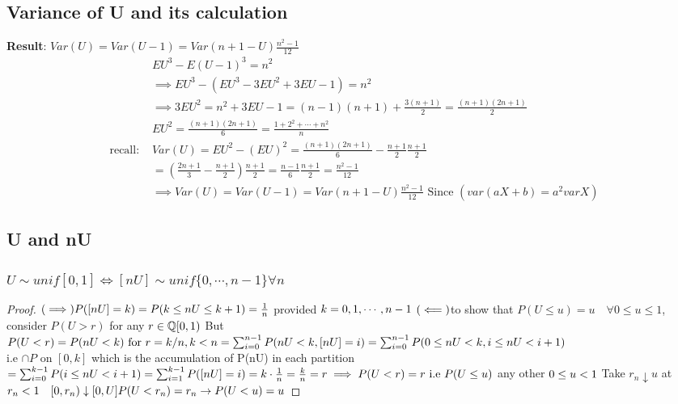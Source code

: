 \documentclass{article}
\theoremstyle{definition}
\theoremstyle{thrm}
\theoremstyle{lma}
\theoremstyle{ppst}
\theoremstyle{crlr}
\begin{document}
\subsection{Variance of U and its calculation}
\textbf{Result}: $Var(U) = Var(U-1) = Var(n+1-U)\frac{n^2-1}{12}$\\
\begin{align*}
	&EU^3-E(U-1)^3 =n^2\\
	&\implies EU^3-(EU^3-3EU^2+3EU-1)=n^2\\
	&\implies 3EU^2 = n^2+3EU-1=(n-1)(n+1)+\frac{3(n+1)}{2} = \frac{(n+1)(2n+1)}{2}\\
	&EU^2 = \frac{(n+1)(2n+1)}{6} = \frac{1+2^2+\cdots+n^2}{n}\\
	\text{recall: } &Var(U) = EU^2-(EU)^2 = \frac{(n+1)(2n+1)}{6}- \frac{n+1}{2}\frac{n+1}{2}\\
	&=(\frac{2n+1}{3}-\frac{n+1}{2})\frac{n+1}{2} = \frac{n-1}{6}\frac{n+1}{2} = \frac{n^2-1}{12}\\
	&\implies Var(U) = Var(U-1) = Var(n+1-U)\frac{n^2-1}{12} \text{ Since }(var(aX+b) = a^2varX)
\end{align*}
\subsection{U and nU}
\subsubsection{$U\sim unif[0,1]\iff [nU]\sim unif\{0,\cdots,n-1\}\forall n$}
\begin{proof}
	$\\ (\implies)\\ P([nU]=k) = P(k \leq nU \leq k+1) = \frac{1}{n}$ provided $k=0,1,\cdots, n-1\\$
	$(\impliedby)\\$to show that $P(U\leq u) = u \quad \forall 0\leq u\leq 1$, consider $P(U>r)$ for any $r \in \mathbb{Q}[0,1)\\$ But
	$P(U <r) = P(nU < k) \text{ for } r = k/n, k<n \\= \sum_{i=0}^{n-1}P(nU<k,[nU]=i) = \sum_{i=0}^{n-1}P(0 \leq nU <k, i\leq nU<i+1)$ \\
	i.e $\cap P \text{ on } [0,k]$ which is the accumulation of P(nU) in each partition\\
	$= \sum_{i=0}^{k-1}P(i\leq nU<i+1) = \sum_{i=1}^{k-1}P([nU]=i)\\
	=k \cdot \frac{1}{n} = \frac{k}{n} = r\\ \implies P(U<r) = r \text{ i.e } P(U\leq u)$ any other $0\leq u <1\\$
	Take $r_n \downarrow u$ at $r_n <1 \quad [0,r_n)\downarrow [0,U]\\P(U<r_n)=r_n \to P(U<u)=u$
\end{proof}
\end{document}
